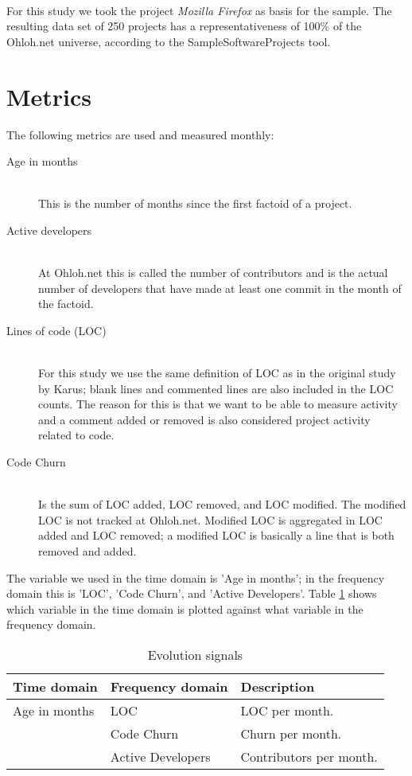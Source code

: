 \paragraph{}
For this study we took the project \emph{Mozilla Firefox }\rm as basis for
the sample. The resulting data set of 250 projects has a representativeness of
100\% of the Ohloh.net universe, according to the SampleSoftwareProjects tool.

\section{Metrics}
The following metrics are used and measured monthly:

\begin{description}
	\item[Age in months] \hfill \\
		This is the number of months since the first factoid of a project.

	\item[Active developers] \hfill \\
		At Ohloh.net this is called the number of contributors and is the actual
		number of developers that have made at least one commit in the month of the
		factoid.
	
	\item[Lines of code (LOC)] \hfill \\
		For this study we use the same definition of LOC as in the original study by
		Karus; blank lines and commented lines are also included in the LOC counts.
		The reason for this is that we want to be able to measure activity and a
		comment added or removed is also considered project activity related to code.

	\item[Code Churn] \hfill \\
		Is the sum of LOC added, LOC removed, and LOC modified. The modified LOC is
		not tracked at Ohloh.net. Modified LOC is aggregated in LOC added and LOC
		removed; a modified LOC is basically a line that is both removed and added.

\end{description}

\noindent
The variable we used in the time domain is 'Age in months'; in the
frequency domain this is 'LOC', 'Code Churn', and 'Active Developers'. Table
\ref{tab:series} shows which variable in the time domain is plotted against
what variable in the frequency domain.

\begin{table}
\centering
	\caption{Evolution signals}
	\begin{tabular}{| p{4cm} | p{4cm} | p{4cm} |}
	\hline
	Time domain & Frequency domain & Description \\ \hline
	Age in months   & LOC & LOC per month. \\
					& Code Churn & Churn per month. \\
					& Active Developers & Contributors per month. \\ \hline
	\end{tabular}
\label{tab:series}
\end{table}

